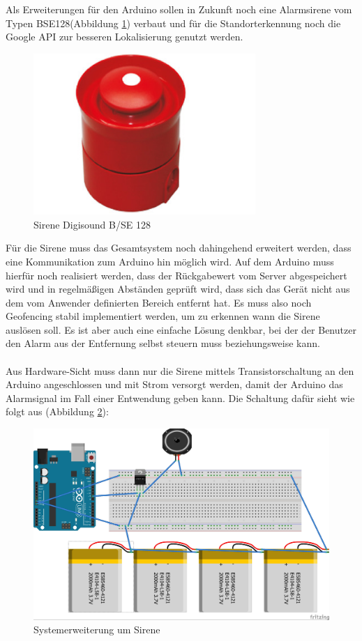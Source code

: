 Als Erweiterungen für den Arduino sollen in Zukunft noch eine Alarmsirene vom Typen BSE128(Abbildung \ref{digi}) verbaut  und für die Standorterkennung noch die Google API zur besseren Lokalisierung genutzt werden. 
\begin{figure} [H]
	\begin{center}
		\includegraphics[width=0.75\textwidth]{Bilder/Digisound.jpg}
		\caption{Sirene Digisound B/SE 128}
		\label{digi}
	\end{center}
\end{figure}
Für die Sirene muss das Gesamtsystem noch dahingehend erweitert werden, dass eine Kommunikation zum Arduino hin möglich wird. Auf dem Arduino muss hierfür noch realisiert werden, dass der Rückgabewert vom Server abgespeichert wird und in regelmäßigen Abständen geprüft wird, dass sich das Gerät nicht aus dem vom Anwender definierten Bereich entfernt hat. Es muss also noch Geofencing stabil implementiert werden, um zu erkennen wann die Sirene auslösen soll. Es ist aber auch eine einfache Lösung denkbar, bei der der Benutzer den Alarm aus der Entfernung selbst steuern muss beziehungsweise kann.
\\
\\
Aus Hardware-Sicht muss dann nur die Sirene mittels Transistorschaltung an den Arduino angeschlossen und mit Strom versorgt werden, damit der Arduino das Alarmsignal im Fall einer Entwendung geben kann. Die Schaltung dafür sieht wie folgt aus (Abbildung \ref{sirene}):
\begin{figure} [H]
	\begin{center}
		\includegraphics[width=1\textwidth]{Bilder/Arduino_Sirene.jpg}
		\caption{Systemerweiterung um Sirene}
		\label{sirene}
	\end{center}
\end{figure}
